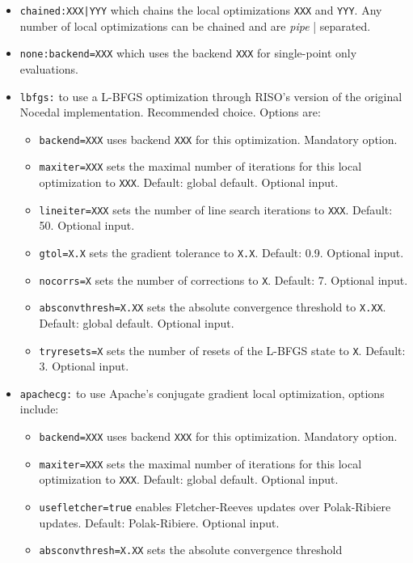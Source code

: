 \documentclass[a4paper,10pt]{scrbook}
\begin{document}
\begin{itemize}
  \item \texttt{chained:XXX|YYY} which chains the local optimizations 
\texttt{XXX} and \texttt{YYY}. Any number of local optimizations can be chained 
and are \textit{pipe} | separated.
  \item \texttt{none:backend=XXX} which uses the backend \texttt{XXX} for 
single-point only evaluations.
  \item \texttt{lbfgs:} to use a L-BFGS optimization through RISO's version of 
the original Nocedal implementation. Recommended choice. Options are:
    \begin{itemize}
      \item \texttt{backend=XXX} uses backend \texttt{XXX} for this 
optimization. Mandatory option.
      \item \texttt{maxiter=XXX} sets the maximal number of iterations for this 
local optimization to \texttt{XXX}. Default: global default. Optional input.
      \item \texttt{lineiter=XXX} sets the number of line search iterations to 
\texttt{XXX}. Default: 50. Optional input.
      \item \texttt{gtol=X.X} sets the gradient tolerance to \texttt{X.X}. 
Default: 0.9. Optional input.
      \item \texttt{nocorrs=X} sets the number of corrections to \texttt{X}. 
Default: 7. Optional input.
      \item \texttt{absconvthresh=X.XX} sets the absolute convergence threshold 
to \texttt{X.XX}. Default: global default. Optional input.
      \item \texttt{tryresets=X} sets the number of resets of the L-BFGS state 
to \texttt{X}. Default: 3. Optional input.
    \end{itemize}
  \item \texttt{apachecg:} to use Apache's conjugate gradient local 
optimization, options include:
    \begin{itemize}
      \item \texttt{backend=XXX} uses backend \texttt{XXX} for this 
optimization. Mandatory option.
      \item \texttt{maxiter=XXX} sets the maximal number of iterations for this 
local optimization to \texttt{XXX}. Default: global default. Optional input.
      \item \texttt{usefletcher=true} enables Fletcher-Reeves updates over 
Polak-Ribiere updates. Default: Polak-Ribiere. Optional input.
      \item \texttt{absconvthresh=X.XX} sets the absolute convergence threshold 

\end{itemize}
\end{itemize}
\end{document}
